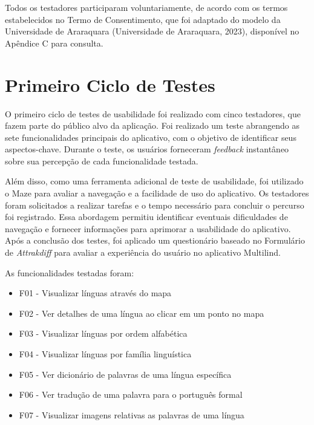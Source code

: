 Todos os testadores participaram voluntariamente, de acordo com os termos estabelecidos no Termo de Consentimento, que foi adaptado do 
modelo da Universidade de Araraquara (Universidade de Araraquara, 2023), disponível no Apêndice C para consulta.
 
\section{Primeiro Ciclo de Testes}
\label{sec:Primeiro Ciclo}
O primeiro ciclo de testes de usabilidade foi realizado com cinco testadores, que fazem parte do público alvo da aplicação. Foi realizado um teste abrangendo as sete funcionalidades 
principais do aplicativo, com o objetivo de identificar seus aspectos-chave. Durante o teste, os usuários forneceram \textit{feedback} instantâneo sobre sua percepção de cada funcionalidade testada. 

Além disso, como uma ferramenta adicional de teste de usabilidade, foi utilizado o Maze para avaliar a navegação e a facilidade de uso do aplicativo. Os testadores foram solicitados a realizar  
tarefas e o tempo necessário para concluir o percurso foi registrado. Essa abordagem permitiu identificar eventuais dificuldades de navegação e fornecer informações para aprimorar a usabilidade do aplicativo.
Após a conclusão dos testes, foi aplicado um questionário baseado no Formulário de \textit{Attrakdiff} para avaliar a experiência do usuário no aplicativo Multilind.

\begin{description}
    \item As funcionalidades testadas foram:
	\begin{itemize}
		\item F01 - Visualizar línguas através do mapa
		\item F02 - Ver detalhes de uma língua ao clicar em um ponto no mapa
		\item F03 - Visualizar línguas por ordem alfabética
		\item F04 - Visualizar línguas por família linguística
		\item F05 - Ver dicionário de palavras de uma língua específica
		\item F06 - Ver tradução de uma palavra para o português formal
		\item F07 - Visualizar imagens relativas as palavras de uma língua
	\end{itemize}
\end{description}

